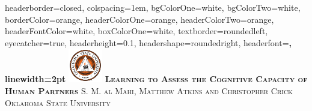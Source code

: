 \documentclass[portrait,a0paper,fontscale=0.28]{baposter} %
\begin{document}
\begin{poster}
{
headerborder=closed, %
colspacing=1em, %
bgColorOne=white, %
bgColorTwo=white, %
borderColor=orange, %
headerColorOne=orange, %
headerColorTwo=orange, %
headerFontColor=white, %
boxColorOne=white, %
textborder=roundedleft, %
eyecatcher=true, %
headerheight=0.1\textheight, %
headershape=roundedright, %
headerfont=\Large\bf\textsc, %
linewidth=2pt %
}
%
{\includegraphics[height=4em]{OSUlogo}} %
{\bf\textsc{Learning to Assess the Cognitive Capacity of Human Partners}} %
{\textsc{S. M. al Mahi, Matthew Atkins and Christopher Crick\\Oklahoma State University\hspace{12pt} }} %


\end{poster}
\end{document}
